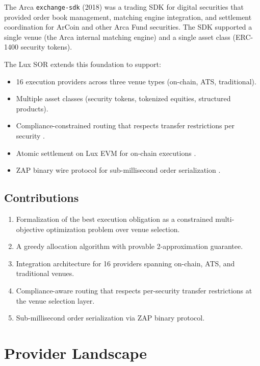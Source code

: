 \documentclass[11pt,a4paper]{article}
\begin{document}
The Arca \texttt{exchange-sdk} (2018) was a trading SDK for digital securities that provided order book management, matching engine integration, and settlement coordination for ArCoin and other Arca Fund securities. The SDK supported a single venue (the Arca internal matching engine) and a single asset class (ERC-1400 security tokens).

The Lux SOR extends this foundation to support:

\begin{itemize}[nosep]
  \item 16 execution providers across three venue types (on-chain, ATS, traditional).
  \item Multiple asset classes (security tokens, tokenized equities, structured products).
  \item Compliance-constrained routing that respects transfer restrictions per security \cite{lux-security-token-standard}.
  \item Atomic settlement on Lux EVM for on-chain executions \cite{lux-ats-architecture}.
  \item ZAP binary wire protocol for sub-millisecond order serialization \cite{lux-zap-wire-protocol}.
\end{itemize}

\subsection{Contributions}

\begin{enumerate}[nosep]
  \item Formalization of the best execution obligation as a constrained multi-objective optimization problem over venue selection.
  \item A greedy allocation algorithm with provable 2-approximation guarantee.
  \item Integration architecture for 16 providers spanning on-chain, ATS, and traditional venues.
  \item Compliance-aware routing that respects per-security transfer restrictions at the venue selection layer.
  \item Sub-millisecond order serialization via ZAP binary protocol.
\end{enumerate}

\section{Provider Landscape}\label{sec:providers}
\end{document}

